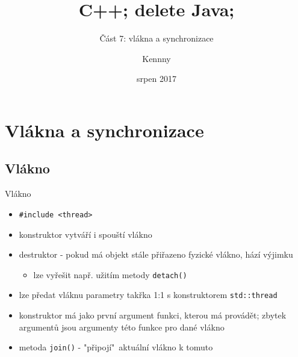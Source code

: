 \documentclass{beamer}
\begin{document}
\title{C++; delete Java;}
\subtitle{Část 7: vlákna a synchronizace}
\author{Kennny}
\date{srpen 2017}

\frame{\titlepage}


\newenvironment{xframe}[1][]
  {\begin{frame}[fragile,environment=xframe,#1]}
  {\end{frame}}

\begin{comment}
\begin{xframe}{tttt}
	\begin{itemize}
		\item
	\end{itemize}
\end{xframe}
\end{comment}



\section{Vlákna a synchronizace}
\subsection{Vlákno}



\begin{xframe}{Vlákno}
	\begin{itemize}
		\item \texttt{\#include <thread>}
		\item konstruktor vytváří i spouští vlákno
		\item destruktor - pokud má objekt stále přiřazeno fyzické vlákno, hází výjimku
			\begin{itemize}
				\item lze vyřešit např. užitím metody \texttt{detach()}
			\end{itemize}
		\item lze předat vláknu parametry takřka 1:1 s konstruktorem \texttt{std::thread}
		\item konstruktor má jako první argument funkci, kterou má provádět; zbytek argumentů jsou argumenty této funkce pro dané vlákno
		\item metoda \texttt{join()} - "připojí"~aktuální vlákno k tomuto
	\end{itemize}
\end{xframe}
\end{document}
